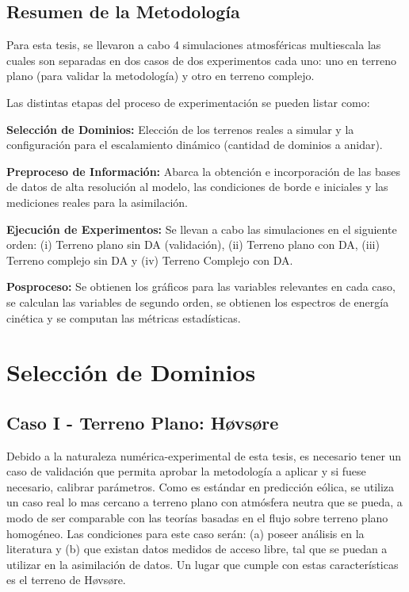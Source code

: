 \subsection{Resumen de la Metodología}
Para esta tesis, se llevaron a cabo 4 simulaciones atmosféricas multiescala las cuales son separadas en dos casos de dos experimentos cada uno: uno en terreno plano (para validar la metodología) y otro en terreno complejo.

Las distintas etapas del proceso de experimentación se pueden listar como:
\begin{enumerate*}
	\item \textbf{Selección de Dominios: } Elección de los terrenos reales a simular y la configuración para el escalamiento dinámico (cantidad de dominios a anidar).
	\item \textbf{Preproceso de Información:} Abarca la obtención e incorporación de las bases de datos de alta resolución al modelo, las condiciones de borde e iniciales y las mediciones reales para la asimilación.
	\item \textbf{Ejecución de Experimentos:} Se llevan a cabo las simulaciones en el siguiente orden: (i) Terreno plano sin DA (validación), (ii) Terreno plano con DA, (iii) Terreno complejo sin DA y (iv) Terreno Complejo con DA.
	\item \textbf{Posproceso:} Se obtienen los gráficos para las variables relevantes en cada caso, se calculan las variables de segundo orden, se obtienen los espectros de energía cinética y se computan las métricas estadísticas.
\end{enumerate*}
\newpage
\section{Selección de Dominios}
\subsection{Caso I - Terreno Plano: Høvsøre}
 Debido a la naturaleza numérica-experimental de esta tesis, es necesario tener un caso de validación que permita aprobar la metodología a aplicar y si fuese necesario, calibrar parámetros. Como es estándar en predicción eólica, se utiliza un caso real lo mas cercano a terreno plano  con atmósfera neutra que se pueda, a modo de ser comparable con las teorías basadas en el flujo sobre terreno plano homogéneo. Las condiciones para este caso serán: (a) poseer análisis en la literatura y (b) que existan datos medidos de acceso libre, tal que se puedan a utilizar en la asimilación de datos. Un lugar que cumple con estas características es el terreno de Høvsøre.

